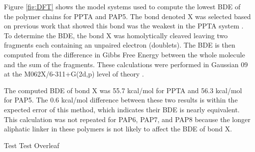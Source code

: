 \documentclass[journal=langd5,manuscript=article]{achemso}
\begin{document}
Figure \ref{fig:DFT} shows the model systems used to compute the 
lowest BDE of the polymer chains for PPTA and PAP5.
The bond denoted X was selected based on previous work 
that showed this bond was the weakest in the PPTA system \cite{mercer2017molecular}.
To determine the BDE, the bond X was homolytically cleaved leaving
two fragments each containing an unpaired electron (doublets).
The BDE is then computed from the
difference in Gibbs Free Energy between the whole
molecule and the sum of the fragments.
These calculations were performed in Gaussian 09 \cite{g09}
at the M062X/6-311+G(2d,p) level of theory \cite{zhao_2008,mclean_1980}.

The computed BDE of bond X was 55.7 kcal/mol for PPTA and
56.3 kcal/mol for PAP5.
The 0.6 kcal/mol difference between these two results is
within the expected error of this method, which indicates
their BDE is nearly equivalent.
This calculation was not repeated for PAP6, PAP7, and PAP8 because
the longer aliphatic linker in these polymers is not likely to affect the BDE of bond X.

Test
Test Overleaf
\FloatBarrier

\end{document}
